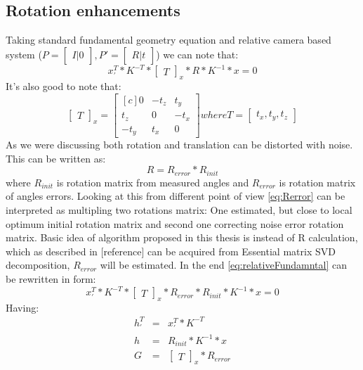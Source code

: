 \subsection{Rotation enhancements}
Taking standard fundamental geometry equation and relative camera based system ($P = \begin{bmatrix}I |0\end{bmatrix}, P' = \begin{bmatrix}R|t\end{bmatrix}$) we can note that:
\begin{equation} \label{eq:relativeFundamntal}
{x}_{'}^{T} * K^{-T} * \begin{bmatrix}T\end{bmatrix}_{x} * R * K^{-1} * x = 0
\end{equation}
It's also good to note that:
\begin{equation} \label{eq:skewTranslation}
\begin{bmatrix}T\end{bmatrix}_{x} = 
\begin{bmatrix*}[c]
 0 & -t_{z} & t_{y}\\
 t_{z} & 0 & -t_{x}\\
-t_{y} & t_{x} & 0 
\end{bmatrix*} 
where T = \begin{bmatrix}t_{x},t_{y},t_{z}\end{bmatrix}
\end{equation}
As we were discussing both rotation and translation can be distorted with noise. This can be written as:
\begin{equation} \label{eq:Rerror}
R = R_{error} * R_{init} 
\end{equation}
where $R_{init}$ is rotation matrix from measured angles and $R_{error}$ is rotation matrix of angles errors.
Looking at this from different point of view \ref{eq:Rerror} can be interpreted as multipling two rotations matrix: 
One estimated, but close to local optimum initial rotation matrix and second one correcting noise error rotation matrix. 
Basic idea of algorithm proposed in this thesis is instead of R calculation, which as described in [reference] can be acquired from Essential matrix SVD decomposition, $R_{error}$ will be estimated. In the end \ref{eq:relativeFundamntal} can be rewritten in form:
\begin{equation} \label{eq:relativeFundamntalEnhanced}
{x}_{'}^{T} * K^{-T} * \begin{bmatrix}T\end{bmatrix}_{x} * R_{error} * R_{init} * K^{-1} * x = 0
\end{equation}
Having:
\begin{equation} \label{eq:leftRelative}
\begin{array}{lcl}
h_{'}^{T} &=& {x}_{'}^{T} * K^{-T} \\
h &=& R_{init} * K^{-1} * x \\
G &=& \begin{bmatrix}T\end{bmatrix}_{x} * R_{error} \\
\end{array}
\end{equation}

